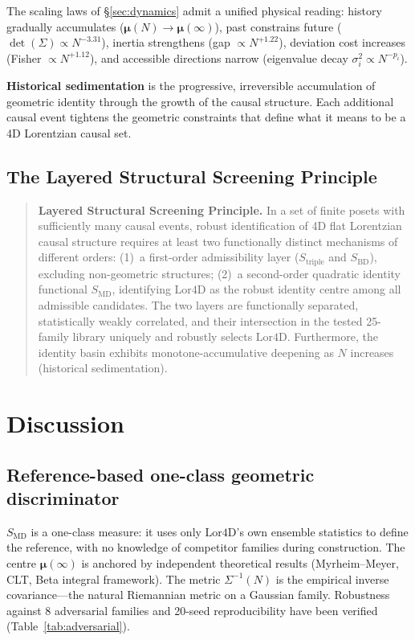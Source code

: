 \documentclass[12pt,a4paper]{article}
\newcommand{\SBD}{S_{\mathrm{BD}}}
\newcommand{\SMD}{S_{\mathrm{MD}}}
\newcommand{\Lor}{\mathrm{Lor4D}}
\begin{document}
The scaling laws of \S\ref{sec:dynamics} admit a unified physical reading:
history gradually accumulates ($\bm{\mu}(N)\to\bm{\mu}(\infty)$),
past constrains future ($\det(\Sigma)\propto N^{-3.31}$),
inertia strengthens (gap $\propto N^{+1.22}$),
deviation cost increases (Fisher $\propto N^{+1.12}$),
and accessible directions narrow (eigenvalue decay $\sigma_i^2\propto N^{-p_i}$).

\textbf{Historical sedimentation} is the progressive, irreversible accumulation
of geometric identity through the growth of the causal structure.
Each additional causal event tightens the geometric constraints that define what
it means to be a 4D Lorentzian causal set.

\subsection{The Layered Structural Screening Principle}

\begin{quote}
\textbf{Layered Structural Screening Principle.}
In a set of finite posets with sufficiently many causal events, robust
identification of 4D flat Lorentzian causal structure requires at least two
functionally distinct mechanisms of different orders:
(1)~a first-order admissibility layer ($S_{\mathrm{triple}}$ and $\SBD$),
excluding non-geometric structures;
(2)~a second-order quadratic identity functional $\SMD$, identifying $\Lor$ as
the robust identity centre among all admissible candidates.
The two layers are functionally separated, statistically weakly correlated, and
their intersection in the tested 25-family library uniquely and robustly selects
$\Lor$.
Furthermore, the identity basin exhibits monotone-accumulative deepening as $N$
increases (historical sedimentation).
\end{quote}

\section{Discussion}
\label{sec:discussion}

\subsection{Reference-based one-class geometric discriminator}

$\SMD$ is a one-class measure: it uses only $\Lor$'s own ensemble statistics to
define the reference, with no knowledge of competitor families during
construction.
The centre $\bm{\mu}(\infty)$ is anchored by independent theoretical results
(Myrheim--Meyer, CLT, Beta integral framework).
The metric $\Sigma^{-1}(N)$ is the empirical inverse covariance---the natural
Riemannian metric on a Gaussian family.
Robustness against 8 adversarial families and 20-seed reproducibility have been
verified (Table~\ref{tab:adversarial}).
\end{document}
